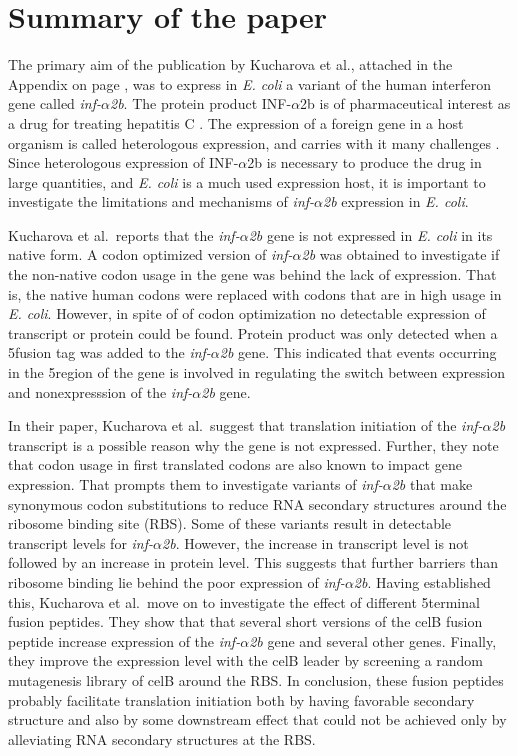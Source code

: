 %
\section{Summary of the paper}
The primary aim of the publication by Kucharova et al., attached in the
Appendix on page \pageref{vero_paper}, was to express in \textit{E. coli} a
variant of the human interferon gene called \textit{inf-$\alpha$2b}. The
protein product INF-$\alpha$2b is of pharmaceutical interest as a drug for
treating hepatitis C \cite{manns_peginterferon_2001}. The expression of a
foreign gene in a host organism is called heterologous expression, and carries
with it many challenges \cite{gustafsson_codon_2004}. Since heterologous
expression of INF-$\alpha$2b is necessary to produce the drug in large
quantities, and \textit{E. coli} is a much used expression host, it is
important to investigate the limitations and mechanisms of
\textit{inf-$\alpha$2b} expression in \textit{E. coli}.

Kucharova et al.\ reports that the \textit{inf-$\alpha$2b} gene is not
expressed in \textit{E. coli} in its native form. A codon optimized version of
\textit{inf-$\alpha$2b} was obtained to investigate if the non-native codon
usage in the gene was behind the lack of expression. That is, the native human
codons were replaced with codons that are in high usage in \textit{E. coli}.
However, in spite of of codon optimization no detectable expression of
transcript or protein could be found. Protein product was only detected when a
5\ppp fusion tag was added to the \textit{inf-$\alpha$2b} gene. This indicated
that events occurring in the 5\ppp region of the gene is involved in regulating
the switch between expression and nonexpresssion of the \textit{inf-$\alpha$2b}
gene.

In their paper, Kucharova et al.\ suggest that translation initiation of the
\textit{inf-$\alpha$2b} transcript is a possible reason why the gene is not
expressed. Further, they note that codon usage in first translated codons are
also known to impact gene expression. That prompts them to investigate variants
of \textit{inf-$\alpha$2b} that make synonymous codon substitutions to reduce
RNA secondary structures around the ribosome binding site (RBS). Some of these
variants result in detectable transcript levels for \textit{inf-$\alpha$2b}.
However, the increase in transcript level is not followed by an increase in
protein level. This suggests that further barriers than ribosome binding lie
behind the poor expression of \textit{inf-$\alpha$2b}. Having established this,
Kucharova et al.\ move on to investigate the effect of different 5\ppp terminal
fusion peptides. They show that that several short versions of the celB fusion
peptide increase expression of the \textit{inf-$\alpha$2b} gene and several
other genes. Finally, they improve the expression level with the celB leader by
screening a random mutagenesis library of celB around the RBS. In conclusion,
these fusion peptides probably facilitate translation initiation both by having
favorable secondary structure and also by some downstream effect that could not
be achieved only by alleviating RNA secondary structures at the RBS.

